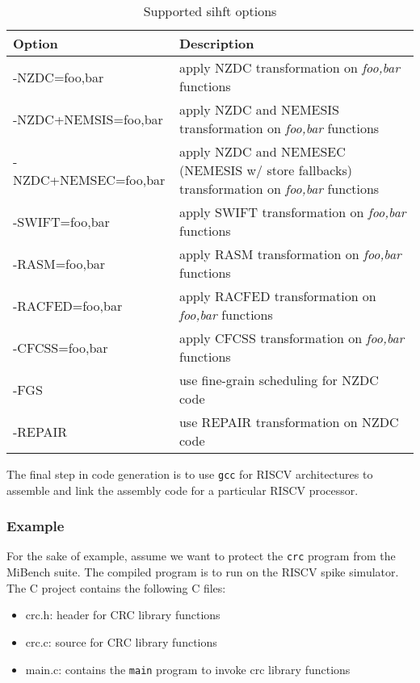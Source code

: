 \begin{table}[htb]
 \centering
 \caption{Supported \ac{sihft} options}
 \label{tab:sihft-options}

 \begin{tabular}{|l|l|}
  \hline
  \textbf{Option} & \textbf{Description}                                     \\
  \hline
  -NZDC=foo,bar   & apply NZDC transformation on \textit{foo,bar} functions  \\
  -NZDC+NEMSIS=foo,bar   & apply NZDC and NEMESIS transformation on \textit{foo,bar} functions  \\
  -NZDC+NEMSEC=foo,bar   & apply NZDC and NEMESEC (NEMESIS w/ store fallbacks) transformation on \textit{foo,bar} functions  \\
  -SWIFT=foo,bar  & apply SWIFT transformation on \textit{foo,bar} functions \\
  -RASM=foo,bar   & apply RASM transformation on \textit{foo,bar} functions  \\
  -RACFED=foo,bar & apply RACFED transformation on \textit{foo,bar} functions  \\
  -CFCSS=foo,bar  & apply CFCSS transformation on \textit{foo,bar} functions \\
  -FGS            & use fine-grain scheduling for NZDC code                  \\
  -REPAIR         & use REPAIR transformation on NZDC code                   \\
  \hline
 \end{tabular}
\end{table}

The final step in code generation is to use \texttt{gcc} for RISCV architectures to assemble and link the
assembly code for a particular RISCV processor.

\subsubsection{Example}
For the sake of example, assume we want to protect the \texttt{crc} program from the MiBench suite. The
compiled program is to run on the RISCV spike simulator. The C project contains the following C files:

\begin{itemize}
 \item{crc.h: header for CRC library functions}
 \item{crc.c: source for CRC library functions}
 \item{main.c: contains the \texttt{main} program to invoke crc library functions}
\end{itemize}

